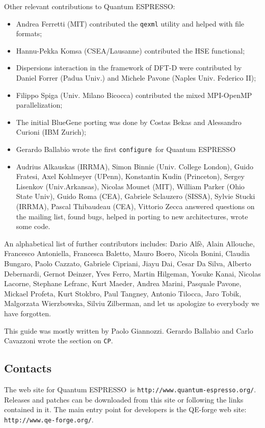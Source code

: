 \documentclass[12pt,a4paper]{article}
\def\qe{{\sc Quantum ESPRESSO}}
\def\configure{\texttt{configure}}
\def\CP{\texttt{CP}}
\begin{document}
Other relevant contributions to \qe:
\begin{itemize}
  \item Andrea Ferretti (MIT) contributed the \texttt{qexml} utility 
  and helped with file formats;
  \item Hannu-Pekka Komsa (CSEA/Lausanne) contributed
  the HSE functional;
  \item Dispersions interaction in the framework of DFT-D were
  contributed by Daniel Forrer (Padua Univ.) and Michele Pavone
  (Naples Univ. Federico II);
 \item Filippo Spiga (Univ. Milano Bicocca) contributed the
  mixed MPI-OpenMP parallelization;
  \item The initial BlueGene porting was done by Costas Bekas and
  Alessandro Curioni (IBM Zurich);
  \item Gerardo Ballabio wrote the first \configure\ for \qe
  \item Audrius Alkauskas (IRRMA), 
Simon Binnie (Univ. College London), Guido Fratesi, Axel Kohlmeyer (UPenn),
Konstantin Kudin (Princeton), Sergey Lisenkov (Univ.Arkansas), 
Nicolas Mounet (MIT), William Parker (Ohio State Univ), 
Guido Roma (CEA), Gabriele Sclauzero (SISSA), Sylvie Stucki (IRRMA), 
Pascal Thibaudeau (CEA), Vittorio Zecca
answered questions on the mailing list, found bugs, helped in 
porting to new architectures, wrote some code.
\end{itemize}

An alphabetical list of further contributors includes: Dario Alf\`e, 
Alain Allouche, Francesco Antoniella, Francesca Baletto,
Mauro Boero, Nicola Bonini, Claudia Bungaro, 
Paolo Cazzato, Gabriele Cipriani, Jiayu Dai, Cesar Da Silva, 
Alberto Debernardi, Gernot Deinzer, Yves Ferro,
Martin Hilgeman,  Yosuke Kanai, Nicolas Lacorne, Stephane Lefranc,
Kurt Maeder, Andrea Marini, 
Pasquale Pavone,  Mickael Profeta, Kurt Stokbro, 
Paul Tangney, 
Antonio Tilocca, Jaro Tobik, 
Malgorzata Wierzbowska, Silviu Zilberman, 
and let us apologize to everybody we have forgotten.
 
This guide was mostly written by Paolo Giannozzi.
Gerardo Ballabio and Carlo Cavazzoni wrote the section on \CP.

\subsection{Contacts}

The web site for \qe\ is \texttt{http://www.quantum-espresso.org/}.
Releases and patches can be downloaded from this
site or following the links contained in it. The main entry point for 
developers is the QE-forge web site:
\texttt{http://www.qe-forge.org/}.
\end{document}
